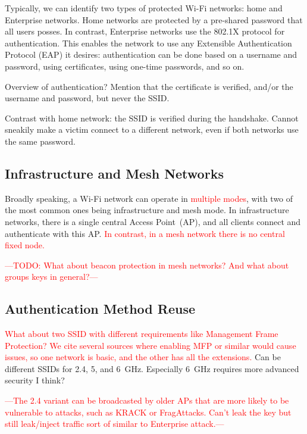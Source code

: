 \documentclass[sigconf,review]{acmart}
\newcommand{\wifi}{\mbox{Wi-Fi}}
\DeclareRobustCommand{\red}[1]{\textcolor{red}{#1}}
\begin{document}
Typically, we can identify two types of protected \wifi{} networks: home and Enterprise networks.
Home networks are protected by a pre-shared password that all users posses.
In contrast, Enterprise networks use the 802.1X protocol for authentication.
This enables the network to use any Extensible Authentication Protocol (EAP) it desires: authentication can be done based on a username and password, using certificates, using one-time passwords, and so on.

Overview of authentication? Mention that the certificate is verified, and/or the username and password, but never the SSID.

Contrast with home network: the SSID is verified during the handshake.
Cannot sneakily make a victim connect to a different network, even if both networks use the same password.

\subsection{Infrastructure and Mesh Networks}

Broadly speaking, a \wifi{} network can operate in \red{multiple modes}, with two of the most common ones being infrastructure and mesh mode.
In infrastructure networks, there is a single central Access Point~(AP), and all clients connect and authenticate with this AP.
\red{In contrast, in a mesh network there is no central fixed node.}

\red{---TODO: What about beacon protection in mesh networks? And what about groups keys in general?---}

\subsection{Authentication Method Reuse}

\red{
	What about two SSID with different requirements like Management Frame Protection?
	We cite several sources where enabling MFP or similar would cause issues, so one network is basic, and the other has all the extensions.}
Can be different SSIDs for 2.4, 5, and 6~GHz.
Especially 6~GHz requires more advanced security I think?

\red{---The 2.4 variant can be broadcasted by older APs that are more likely to be vulnerable to attacks, such as KRACK or FragAttacks. Can't leak the key but still leak/inject traffic sort of similar to Enterprise attack.---}
\end{document}
